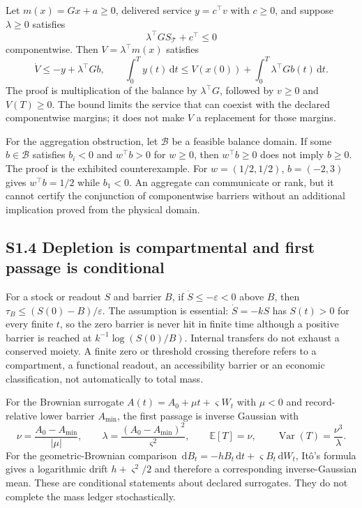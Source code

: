 \documentclass[11pt]{article}
\newcommand{\dd}{\,\mathrm{d}}
\begin{document}
Let $m(x)=Gx+a\geq0$, delivered service $y=c^{\top}v$ with $c\geq0$, and suppose $\lambda\geq0$ satisfies
\begin{equation}
\lambda^{\top}GS_{\mathcal T}+c^{\top}\leq0
\end{equation}
componentwise. Then $V=\lambda^{\top}m(x)$ satisfies
\begin{equation}
\dot V\leq-y+\lambda^{\top}Gb,
\qquad
\int_0^T y(t)\dd t\leq V(x(0))+\int_0^T\lambda^{\top}Gb(t)\dd t.
\end{equation}
The proof is multiplication of the balance by $\lambda^{\top}G$, followed by $v\geq0$ and $V(T)\geq0$. The bound limits the service that can coexist with the declared componentwise margins; it does not make $V$ a replacement for those margins.

For the aggregation obstruction, let $\mathcal B$ be a feasible balance domain. If some $b\in\mathcal B$ satisfies $b_i<0$ and $w^{\top}b>0$ for $w\geq0$, then $w^{\top}b\geq0$ does not imply $b\geq0$. The proof is the exhibited counterexample. For $w=(1/2,1/2)$, $b=(-2,3)$ gives $w^{\top}b=1/2$ while $b_1<0$. An aggregate can communicate or rank, but it cannot certify the conjunction of componentwise barriers without an additional implication proved from the physical domain.

\subsection*{S1.4 Depletion is compartmental and first passage is conditional}

For a stock or readout $S$ and barrier $B$, if $\dot S\leq-\varepsilon<0$ above $B$, then $\tau_B\leq(S(0)-B)/\varepsilon$. The assumption is essential: $\dot S=-kS$ has $S(t)>0$ for every finite $t$, so the zero barrier is never hit in finite time although a positive barrier is reached at $k^{-1}\log(S(0)/B)$. Internal transfers do not exhaust a conserved moiety. A finite zero or threshold crossing therefore refers to a compartment, a functional readout, an accessibility barrier or an economic classification, not automatically to total mass.

For the Brownian surrogate $A(t)=A_0+\mu t+\varsigma W_t$ with $\mu<0$ and record-relative lower barrier $A_{\min}$, the first passage is inverse Gaussian with
\begin{equation}
\nu=\frac{A_0-A_{\min}}{|\mu|},\qquad
\lambda=\frac{(A_0-A_{\min})^2}{\varsigma^2},
\qquad
\mathbb E[T]=\nu,
\qquad
\operatorname{Var}(T)=\frac{\nu^3}{\lambda}.
\end{equation}
For the geometric-Brownian comparison $\dd B_t=-hB_t\dd t+\varsigma B_t\dd W_t$, It\^o's formula gives a logarithmic drift $h+\varsigma^2/2$ and therefore a corresponding inverse-Gaussian mean. These are conditional statements about declared surrogates. They do not complete the mass ledger stochastically.
\end{document}
